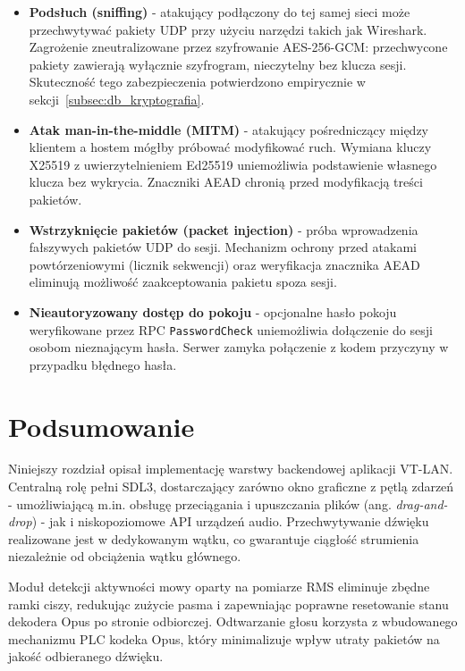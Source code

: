 \begin{itemize}
    \item \textbf{Podsłuch (sniffing)} - atakujący podłączony do tej samej
    sieci może przechwytywać pakiety UDP przy użyciu narzędzi takich jak
    Wireshark. Zagrożenie zneutralizowane przez szyfrowanie AES-256-GCM:
    przechwycone pakiety zawierają wyłącznie szyfrogram, nieczytelny
    bez klucza sesji. Skuteczność tego zabezpieczenia potwierdzono
    empirycznie w sekcji~\ref{subsec:db_kryptografia}.

    \item \textbf{Atak man-in-the-middle (MITM)} - atakujący pośredniczący
    między klientem a hostem mógłby próbować modyfikować ruch.
    Wymiana kluczy X25519 z uwierzytelnieniem Ed25519 uniemożliwia
    podstawienie własnego klucza bez wykrycia. Znaczniki AEAD
    chronią przed modyfikacją treści pakietów.

    \item \textbf{Wstrzyknięcie pakietów (packet injection)} -
    próba wprowadzenia fałszywych pakietów UDP do sesji.
    Mechanizm ochrony przed atakami powtórzeniowymi (licznik sekwencji)
    oraz weryfikacja znacznika AEAD eliminują możliwość zaakceptowania
    pakietu spoza sesji.

    \item \textbf{Nieautoryzowany dostęp do pokoju} - opcjonalne hasło
    pokoju weryfikowane przez RPC \texttt{PasswordCheck} uniemożliwia
    dołączenie do sesji osobom nieznającym hasła. Serwer zamyka połączenie
    z kodem przyczyny w przypadku błędnego hasła.
\end{itemize}

\section{Podsumowanie}
\label{sec:backend_summary}

Niniejszy rozdział opisał implementację warstwy backendowej aplikacji VT-LAN.
Centralną rolę pełni SDL3, dostarczający zarówno okno graficzne z pętlą
zdarzeń - umożliwiającą m.in. obsługę przeciągania i upuszczania plików
(ang. \textit{drag-and-drop}) - jak i niskopoziomowe API urządzeń audio.
Przechwytywanie dźwięku realizowane jest w dedykowanym wątku, co gwarantuje
ciągłość strumienia niezależnie od obciążenia wątku głównego.

Moduł detekcji aktywności mowy oparty na pomiarze RMS eliminuje zbędne
ramki ciszy, redukując zużycie pasma i zapewniając poprawne resetowanie
stanu dekodera Opus po stronie odbiorczej. Odtwarzanie głosu korzysta
z wbudowanego mechanizmu PLC kodeka Opus, który minimalizuje wpływ utraty
pakietów na jakość odbieranego dźwięku.

